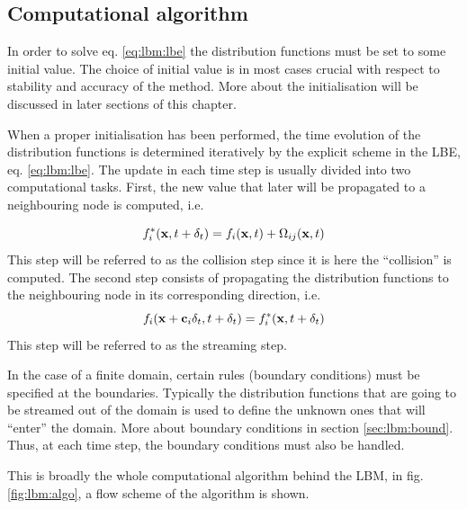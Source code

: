 \subsection{Computational algorithm}
In order to solve eq. \eqref{eq:lbm:lbe} the distribution functions
must be set to some initial value. The choice of initial value is in
most cases crucial with respect to stability and accuracy of the
method. More about the initialisation will be discussed in later
sections of this chapter. 

When a proper initialisation has been performed, the time evolution of
the distribution functions is determined iteratively by the explicit
scheme in the LBE, eq. \eqref{eq:lbm:lbe}. The update in each time
step is usually divided into two computational tasks. First, the new
value that later will be propagated to a neighbouring node is computed,
i.e.

\begin{equation}
f_i^{*}(\mathbf{x}, t + \delta_t) = f_i(\mathbf{x}, t) + \Omega_{ij}(\mathbf{x}, t)
\end{equation}
This step will be referred to as the collision step since it is here
the ``collision'' is computed. The second step consists of propagating
the distribution functions to the neighbouring node in its
corresponding direction, i.e.
\begin{equation}
f_i(\mathbf{x} + \mathbf{c}_i\delta_t, t + \delta_t) = f_i^*(\mathbf{x}, t + \delta_t)
\end{equation}
This step will be referred to as the streaming step.

In the case of a finite domain, certain rules (boundary conditions)
must be specified at the boundaries. Typically the distribution
functions that are going to be streamed out of the domain is used to
define the unknown ones that will ``enter'' the domain. More about
boundary conditions in section \ref{sec:lbm:bound}. Thus, at each time
step, the boundary conditions must also be handled. 

This is broadly the whole computational algorithm behind the LBM, in
fig. \ref{fig:lbm:algo}, a flow scheme of the algorithm is shown.

